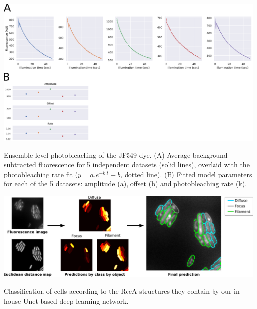 \begin{suppfigure*}[htbp]
\begin{center}
\includegraphics[width=\textwidth]{SI_Figures/SIFig_bleaching.pdf}
\end{center}
\caption{Ensemble-level photobleaching of the JF549 dye. (A) Average background-subtracted fluorescence for 5 independent datasets (solid lines), overlaid with the photobleaching rate fit ($y=a.e^{-k.t}+b$, dotted line). (B) Fitted model parameters for each of the 5 datasets: amplitude (a), offset (b) and photobleaching rate (k).}
\label{SIFig:dye_bleaching}
\end{suppfigure*}


\begin{suppfigure*}[htbp]
\begin{center}
\end{center}
\caption{}
\label{SIFig:frame_intervals}
\end{suppfigure*}


\begin{suppfigure*}[htbp]
\begin{center}
\includegraphics[width=\textwidth]{SI_Figures/ObjectClassifier.pdf}
\end{center}
\caption{Classification of cells according to the RecA structures they contain by our in-house Unet-based deep-learning network.}
\label{SIFig:object_class}
\end{suppfigure*}

